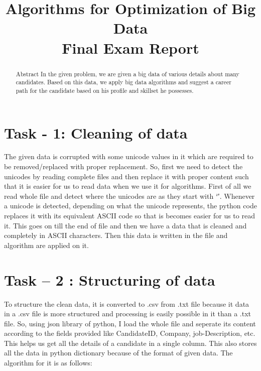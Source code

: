\documentclass[conference]{IEEEtran}
\begin{document}
\title{Algorithms for Optimization of Big Data \\ Final Exam Report \\ }

\author{}
\maketitle

\begin{abstract}
Abstract In the given problem, we are given a big data of various details about many candidates. Based on this data, we apply big data algorithms and suggest a career path for the candidate based on his profile and skillset he possesses. 

\end{abstract}

\IEEEpeerreviewmaketitle



\section{Task - 1: Cleaning of data}

The given data is corrupted with some unicode values in it which are required to be removed/replaced with proper replacement. So, first we need to detect the unicodes by reading complete files and then replace it with proper content such that it is easier for us to read data when we use it for algorithms. First of all we read whole file and detect where the unicodes are as they start with ‘\u’. Whenever a unicode is detected, depending on what the unicode represents, the python code replaces it with its equivalent ASCII code so that is becomes easier for us to read it. This goes on till the end of file and then we have a data that is cleaned and completely in ASCII characters. Then this data is written in the file and algorithm are applied on it. 

\section{Task – 2 : Structuring of data}
To structure the clean data, it is converted to .csv from .txt file because it data in a .csv file is more structured and processing is easily possible in it than a .txt file. So, using json library of python, I load the whole file and seperate its content according to the fields provided like CandidateID, Company, job-Description, etc. This helps us get all the details of a candidate in a single column. This also stores all the data in python dictionary because of the format of given data. The algorithm for it is as follows:
\end{document}
